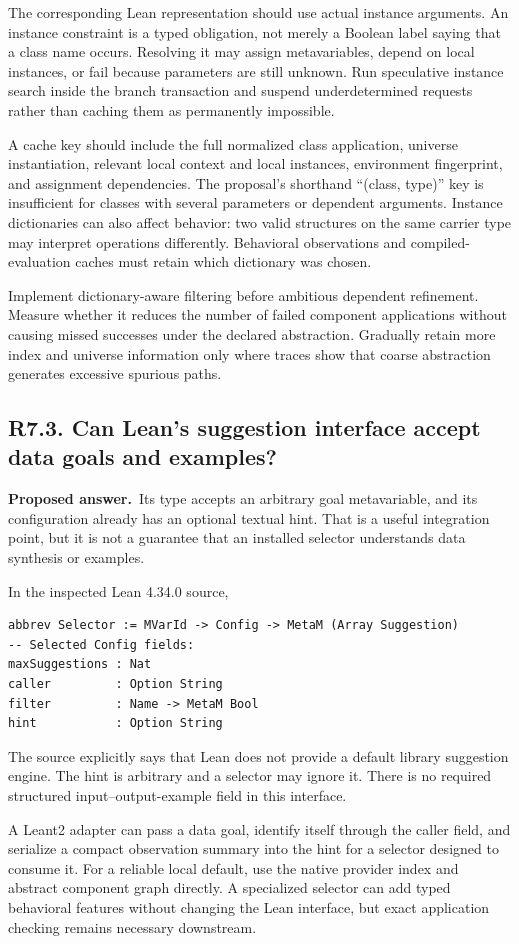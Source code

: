 \documentclass[11pt,a4paper]{article}
\newcommand{\question}[2]{\subsection{#1. #2}\label{q:#1}}
\newcommand{\answer}{\textbf{Proposed answer.}\ }
\theoremstyle{remark}
\begin{document}
The corresponding Lean representation should use actual instance arguments.
An instance constraint is a typed obligation, not merely a Boolean label
saying that a class name occurs. Resolving it may assign metavariables,
depend on local instances, or fail because parameters are still unknown.
Run speculative instance search inside the branch transaction and suspend
underdetermined requests rather than caching them as permanently impossible.

A cache key should include the full normalized class application, universe
instantiation, relevant local context and local instances, environment
fingerprint, and assignment dependencies. The proposal's shorthand
``(class, type)'' key is insufficient for classes with several parameters or
dependent arguments. Instance dictionaries can also affect behavior: two
valid structures on the same carrier type may interpret operations
differently. Behavioral observations and compiled-evaluation caches must
retain which dictionary was chosen.

Implement dictionary-aware filtering before ambitious dependent refinement.
Measure whether it reduces the number of failed component applications
without causing missed successes under the declared abstraction. Gradually
retain more index and universe information only where traces show that
coarse abstraction generates excessive spurious paths.

\question{R7.3}{Can Lean's suggestion interface accept data goals and examples?}

\answer Its type accepts an arbitrary goal metavariable, and its configuration
already has an optional textual hint. That is a useful integration point,
but it is not a guarantee that an installed selector understands data
synthesis or examples.

In the inspected Lean 4.34.0 source,
\begin{lstlisting}
abbrev Selector := MVarId -> Config -> MetaM (Array Suggestion)
-- Selected Config fields:
maxSuggestions : Nat
caller         : Option String
filter         : Name -> MetaM Bool
hint           : Option String
\end{lstlisting}
The source explicitly says that Lean does not provide a default library
suggestion engine. The hint is arbitrary and a selector may ignore it.
There is no required structured input--output-example field in this
interface.\cite{leansuggestions}

A Leant2 adapter can pass a data goal, identify itself through the caller
field, and serialize a compact observation summary into the hint for a
selector designed to consume it. For a reliable local default, use the
native provider index and abstract component graph directly. A specialized
selector can add typed behavioral features without changing the Lean
interface, but exact application checking remains necessary downstream.
\end{document}
